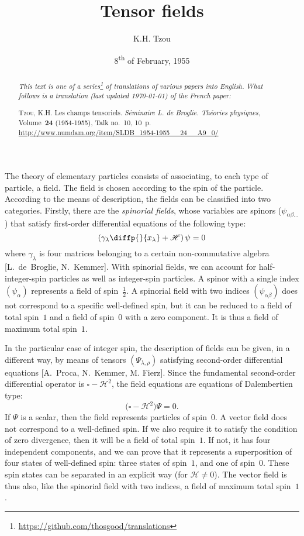 \documentclass{article}
\newcommand{\HH}{\mathscr{H}}
\newcommand{\oldpage}[1]{\marginpar{\footnotesize$\Big\vert$ \textit{p.~#1}}}
\begin{document}
\renewcommand{\abstractname}{Translator's note.}

\title{Tensor fields}
\author{K.H. Tzou}
\date{8\textsuperscript{th} of February, 1955}
\maketitle

\begin{abstract}
  \renewcommand*{\thefootnote}{\fnsymbol{footnote}}
  \emph{This text is one of a series\footnote{\url{https://github.com/thosgood/translations}} of translations of various papers into English.}
  \emph{What follows is a translation (last updated \today) of the French paper:}

  \medskip\noindent
  \textsc{Tzou, K.H.} Les champs tensoriels. \emph{Séminaire L. de Broglie. Théories physiques}, Volume~\textbf{24} (1954-1955), Talk no.~10, 10~p. {\footnotesize\url{http://www.numdam.org/item/SLDB_1954-1955__24__A9_0/}}
\end{abstract}

\tableofcontents



\bigskip\bigskip
\oldpage{13-01}
The theory of elementary particles consists of associating, to each type of particle, a field.
The field is chosen according to the spin of the particle.
According to the means of description, the fields can be classified into two categories.
Firstly, there are the \emph{spinorial fields}, whose variables are spinors ($\psi_{\alpha\beta\ldots}$) that satisfy first-order differential equations of the following type:
\[
  \left(\gamma_\lambda \diffp{}{{x_\lambda}} + \HH\right)\psi = 0
\]
where $\gamma_\lambda$ is four matrices belonging to a certain non-commutative algebra [L.~de~Broglie, N.~Kemmer].
With spinorial fields, we can account for half-integer-spin particles as well as integer-spin particles.
A spinor with a single index $(\psi_\alpha)$ represents a field of spin~$\frac12$.
A spinorial field with two indices $(\psi_{\alpha\beta})$ does not correspond to a specific well-defined spin, but it can be reduced to a field of total spin~$1$ and a field of spin~$0$ with a zero component.
It is thus a field of maximum total spin~$1$.

In the particular case of integer spin, the description of fields can be given, in a different way, by means of tensors $(\Psi_{\lambda,\rho})$ satisfying second-order differential equations [A.~Proca, N.~Kemmer, M. Fierz].
Since the fundamental second-order differential operator is $\square-\HH^2$, the field equations are equations of Dalembertien type:
\[
  \Big(\square-\HH^2\Big)\Psi = 0.
\]
If $\Psi$ is a scalar, then the field represents particles of spin~$0$.
A vector field does not correspond to a well-defined spin.
If we also require it to satisfy the condition of zero divergence, then it will be a field of total spin~$1$.
If not, it has four independent components, and we can prove that it represents a superposition of four states of well-defined spin: three states of spin~$1$, and one of spin~$0$.
These spin states can be separated in an explicit way (for $\HH\neq0$).
The vector field is thus also, like the spinorial field with two indices,
\oldpage{13-02}
a field of maximum total spin~$1$.
\end{document}

